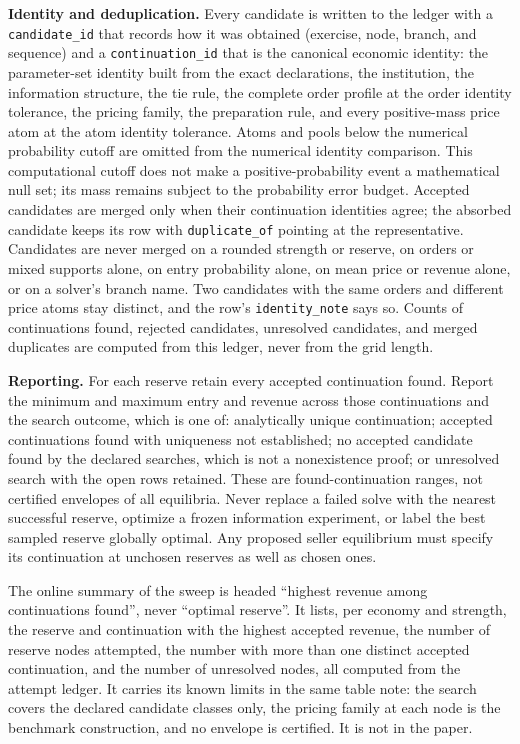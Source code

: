\documentclass[
  11pt,
]{article}
\newcounter{none} %
\begin{document}
\textbf{Identity and deduplication.} Every candidate is written to the
ledger with a \texttt{candidate\_id} that records how it was obtained
(exercise, node, branch, and sequence) and a \texttt{continuation\_id}
that is the canonical economic identity: the parameter-set identity
built from the exact declarations, the institution, the information
structure, the tie rule, the complete order profile at the order
identity tolerance, the pricing family, the preparation rule, and every
positive-mass price atom at the atom identity tolerance. Atoms and pools
below the numerical probability cutoff are omitted from the numerical
identity comparison. This computational cutoff does not make a
positive-probability event a mathematical null set; its mass remains
subject to the probability error budget. Accepted candidates are merged
only when their continuation identities agree; the absorbed candidate
keeps its row with \texttt{duplicate\_of} pointing at the
representative. Candidates are never merged on a rounded strength or
reserve, on orders or mixed supports alone, on entry probability alone,
on mean price or revenue alone, or on a solver's branch name. Two
candidates with the same orders and different price atoms stay distinct,
and the row's \texttt{identity\_note} says so. Counts of continuations
found, rejected candidates, unresolved candidates, and merged duplicates
are computed from this ledger, never from the grid length.

\textbf{Reporting.} For each reserve retain every accepted continuation
found. Report the minimum and maximum entry and revenue across those
continuations and the search outcome, which is one of: analytically
unique continuation; accepted continuations found with uniqueness not
established; no accepted candidate found by the declared searches, which
is not a nonexistence proof; or unresolved search with the open rows
retained. These are found-continuation ranges, not certified envelopes
of all equilibria. Never replace a failed solve with the nearest
successful reserve, optimize a frozen information experiment, or label
the best sampled reserve globally optimal. Any proposed seller
equilibrium must specify its continuation at unchosen reserves as well
as chosen ones.

The online summary of the sweep is headed ``highest revenue among
continuations found'', never ``optimal reserve''. It lists, per economy
and strength, the reserve and continuation with the highest accepted
revenue, the number of reserve nodes attempted, the number with more
than one distinct accepted continuation, and the number of unresolved
nodes, all computed from the attempt ledger. It carries its known limits
in the same table note: the search covers the declared candidate classes
only, the pricing family at each node is the benchmark construction, and
no envelope is certified. It is not in the paper.
\end{document}

